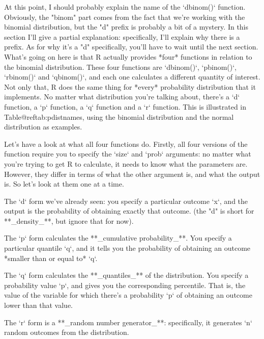 At this point, I should probably explain the name of the `dbinom()` function. Obviously, the "binom" part comes from the fact that we're working with the binomial distribution, but the "d" prefix is probably a bit of a mystery. In this section I'll give a partial explanation: specifically, I'll explain why there is a prefix. As for why it's a "d" specifically, you'll have to wait until the next section. What's going on here is that R actually provides *four* functions in relation to the binomial distribution. These four functions are `dbinom()`, `pbinom()`, `rbinom()` and `qbinom()`, and each one calculates a different quantity of interest. Not only that, R does the same thing for *every* probability distribution that it implements. No matter what distribution you're talking about, there's a `d` function, a `p` function, a `q` function and a `r` function. This is illustrated in Table@reftab:pdistnames, using the binomial distribution and the normal distribution as examples. 

Let's have a look at what all four functions do. Firstly, all four versions of the function require you to specify the `size` and `prob` arguments: no matter what you're trying to get R to calculate, it needs to know what the parameters are. However, they differ in terms of what the other argument is, and what the output is. So let's look at them one at a time.


\item The `d` form we've already seen: you specify a particular outcome `x`, and the output is the probability of obtaining exactly that outcome. (the "d" is short for **_density_**, but ignore that for now).
\item The `p` form calculates the **_cumulative probability_**. You specify a particular quantile `q`, and it tells you the probability of obtaining an outcome *smaller than or equal to* `q`. 
\item The `q` form calculates the **_quantiles_** of the distribution. You specify a probability value `p`, and gives you the corresponding percentile. That is, the value of the variable for which there's a probability `p` of obtaining an outcome lower than that value.
\item The `r` form is a **_random number generator_**: specifically, it generates `n` random outcomes from the distribution.



